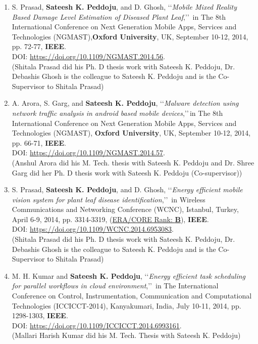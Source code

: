 \begin{enumerate}
	
	\item
	S. Prasad, \textbf{Sateesh K. Peddoju}, and D. Ghosh, \lq\lq \textit{Mobile Mixed Reality Based Damage Level Estimation of Diseased Plant Leaf},\rq\rq\, in The 8th International Conference on Next Generation Mobile Apps, Services and Technologies (NGMAST),\textbf{Oxford University}, UK, September 10-12, 2014, pp. 72-77, \textbf{IEEE}. \\DOI: \url{https://doi.org/10.1109/NGMAST.2014.56}. \\(Shitala Prasad did his Ph. D thesis work with Sateesh K. Peddoju, Dr. Debashis Ghosh is the colleague to Sateesh K. Peddoju and is the Co-Supervisor to Shitala Prasad)

		
	\item
	A. Arora, S. Garg, and \textbf{Sateesh K. Peddoju}, \lq\lq \textit{Malware detection using network traffic analysis in android based mobile devices},\rq\rq\,in The 8th International Conference on Next Generation Mobile Apps, Services and Technologies (NGMAST), \textbf{Oxford University}, UK, September 10-12, 2014, pp. 66-71, \textbf{IEEE}. \\DOI: \url{https://doi.org/10.1109/NGMAST.2014.57}. \\ (Anshul Arora did his  M. Tech. thesis with Sateesh K. Peddoju and Dr. Shree Garg did her Ph. D thesis work with Sateesh K. Peddoju (Co-supervisor))

	
	\item
	S. Prasad, \textbf{Sateesh K. Peddoju}, and D. Ghosh, \lq\lq \textit{Energy efficient mobile vision system for plant leaf disease identification},\rq\rq\, in Wireless Communications and Networking Conference (WCNC), Istanbul, Turkey, April 6-9, 2014, pp. 3314-3319, (\underline{ERA/CORE Rank: \textbf{B}}), \textbf{IEEE}. \\DOI: \url{https://doi.org/10.1109/WCNC.2014.6953083}. \\(Shitala Prasad did his Ph. D thesis work with Sateesh K. Peddoju, Dr. Debashis Ghosh is the colleague to Sateesh K. Peddoju and is the Co-Supervisor to Shitala Prasad)

	
	\item
	M. H. Kumar and \textbf{Sateesh K. Peddoju}, \lq\lq \textit{Energy efficient task scheduling for parallel workflows in cloud environment},\rq\rq\, in The International Conference on Control, Instrumentation, Communication and Computational Technologies (ICCICCT-2014), Kanyakumari, India, July 10-11, 2014, pp. 1298-1303, \textbf{IEEE}. 
\\DOI: \url{https://doi.org/10.1109/ICCICCT.2014.6993161}. \\(Mallari Harish Kumar did his M. Tech. Thesis with Sateesh K. Peddoju)
	

\end{enumerate}
